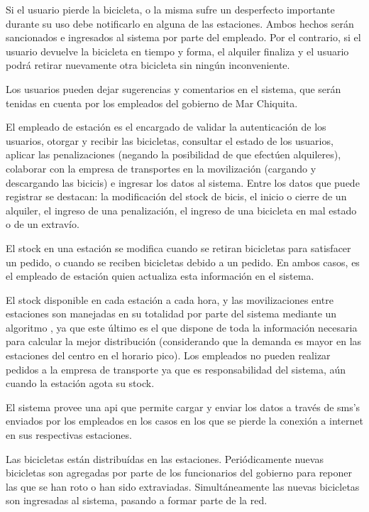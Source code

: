 Si el usuario pierde la bicicleta, o la misma sufre un desperfecto importante durante su uso debe notificarlo en alguna de las estaciones. Ambos hechos serán sancionados e ingresados al sistema
por parte del empleado. Por el contrario, si el usuario devuelve la bicicleta en tiempo y forma, el alquiler finaliza y el usuario podrá retirar nuevamente otra bicicleta sin ningún inconveniente.

Los usuarios pueden dejar sugerencias y comentarios en el sistema, que serán tenidas en cuenta por los empleados del gobierno de Mar Chiquita.

El empleado de estación es el encargado de validar la autenticación de los usuarios, otorgar y recibir las bicicletas, consultar el estado de los usuarios, aplicar las penalizaciones (negando la posibilidad
de que efectúen alquileres), colaborar con la empresa de transportes en la movilización (cargando y descargando las
bicicis) e ingresar los datos al sistema. Entre los datos que puede registrar se destacan: la modificación del stock de bicis, el inicio o cierre de un alquiler, 
el ingreso de una penalización, el ingreso de una bicicleta en mal estado o de un extravío.

El stock en una estación se modifica cuando se retiran bicicletas para satisfacer un pedido, o cuando se reciben bicicletas debido a un pedido. En ambos casos, es el empleado de estación quien actualiza esta información en el sistema.

El stock disponible en cada estación a cada hora, y las movilizaciones entre estaciones son manejadas en su totalidad por parte del sistema mediante un algoritmo
, ya que este último es el que dispone de toda la información necesaria para calcular la mejor distribución (considerando que la demanda es mayor en las estaciones del centro en el horario pico). 
Los empleados no pueden realizar pedidos a la empresa de transporte ya que es responsabilidad del sistema, aún cuando la estación agota su stock.

El sistema provee una api que permite cargar y enviar los datos a través de sms's enviados por los empleados en los casos en los que se pierde la conexión a internet en sus respectivas estaciones. 

Las bicicletas están distribuídas en las estaciones. Periódicamente nuevas bicicletas son agregadas por parte de los funcionarios del gobierno para reponer las que se han roto o han sido extraviadas.
Simultáneamente las nuevas bicicletas son ingresadas al sistema, pasando a formar parte de la red.

